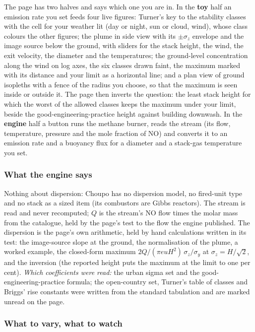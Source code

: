 \documentclass[11pt,a4paper]{article}
\begin{document}
The page has two halves and says which one you are in.  In the \textbf{toy}
half an emission rate you set feeds four live figures: Turner's key to the
stability classes with the cell for your weather lit (day or night, sun or
cloud, wind), whose class colours the other figures; the plume in side view
with its $\pm\sigma_z$ envelope and the image source below the ground, with
sliders for the stack height, the wind, the exit velocity, the diameter and the
temperatures; the ground-level concentration along the wind on log axes, the six
classes drawn faint, the maximum marked with its distance and your limit as a
horizontal line; and a plan view of ground isopleths with a fence of the radius
you choose, so that the maximum is seen inside or outside it.  The page then
inverts the question: the least stack height for which the worst of the allowed
classes keeps the maximum under your limit, beside the good-engineering-practice
height against building downwash.  In the \textbf{engine} half a button runs
the methane burner, reads the  stream (its flow, temperature,
pressure and the mole fraction of NO) and converts it to an emission rate and a
buoyancy flux for a diameter and a stack-gas temperature you set.

\subsubsection*{What the engine says}

Nothing about dispersion: Choupo has no dispersion model, no fired-unit type and
no stack as a sized item (its combustors are Gibbs reactors).  The stream is
read and never recomputed; $Q$ is the stream's NO flow times the molar mass from
the catalogue, held by the page's test to the flow the engine published.  The
dispersion is the page's own arithmetic, held by hand calculations written in
its test: the image-source slope at the ground, the normalisation of the
plume, a worked example, the closed-form maximum $2Q/(\pi e u H^{2})\,
\sigma_z/\sigma_y$ at $\sigma_z=H/\sqrt{2}$, and the inversion (the reported
height puts the maximum at the limit to one per cent).  \emph{Which coefficients
were read:} the urban sigma set and the good-engineering-practice formula; the
open-country set, Turner's table of classes and Briggs' rise constants were
written from the standard tabulation and are marked unread on the page.

\subsubsection*{What to vary, what to watch}
\end{document}
